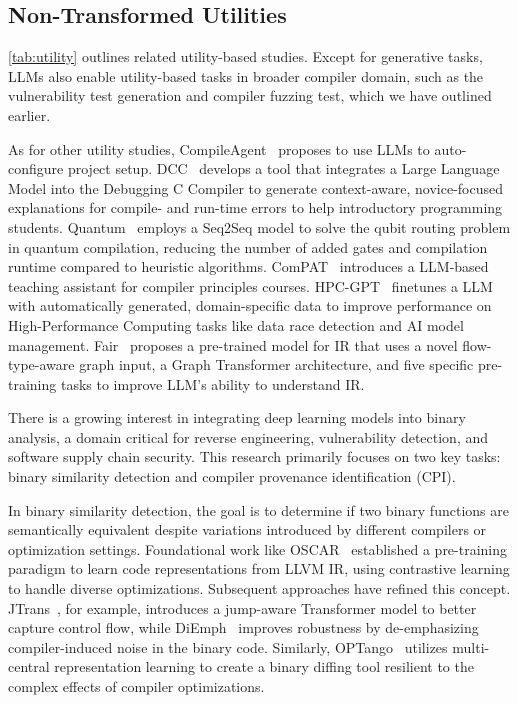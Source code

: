\documentclass[pdflatex,sn-mathphys-ay,twocolumn, a4paper]{sn-jnl}%
\theoremstyle{thmstyleone}%
\theoremstyle{thmstyletwo}%
\theoremstyle{thmstylethree}%
\begin{document}
\subsection{Non-Transformed Utilities}\label{sec:utility}

\autoref{tab:utility} outlines related utility-based studies. Except for generative tasks, LLMs also enable utility-based tasks in broader compiler domain, such as the vulnerability test generation and compiler fuzzing test, which we have outlined earlier. 


As for other utility studies, CompileAgent~\citep{8_hu2025compileagent_acl} proposes to use LLMs to auto-configure project setup. DCC~\citep{80_dcc2024} develops a tool that integrates a Large Language Model into the Debugging C Compiler to generate context-aware, novice-focused explanations for compile- and run-time errors to help introductory programming students. Quantum~\citep{89_quantum2024_dac} employs a Seq2Seq model to solve the qubit routing problem in quantum compilation, reducing the number of added gates and compilation runtime compared to heuristic algorithms. ComPAT~\citep{94_compat2024} introduces a LLM-based teaching assistant for compiler principles courses. HPC-GPT~\citep{149_hpcgpt2023_scw} finetunes a LLM with automatically generated, domain-specific data to improve performance on High-Performance Computing tasks like data race detection and AI model management. Fair~\citep{122_fair2024_icse} proposes a pre-trained model for IR that uses a novel flow-type-aware graph input, a Graph Transformer architecture, and five specific pre-training tasks to improve LLM's ability to understand IR.

There is a growing interest in integrating deep learning models into binary analysis, a domain critical for reverse engineering, vulnerability detection, and software supply chain security. This research primarily focuses on two key tasks: binary similarity detection and compiler provenance identification (CPI).

In binary similarity detection, the goal is to determine if two binary functions are semantically equivalent despite variations introduced by different compilers or optimization settings. Foundational work like OSCAR~\citep{170_how2021_icml} established a pre-training paradigm to learn code representations from LLVM IR, using contrastive learning to handle diverse optimizations. Subsequent approaches have refined this concept. JTrans~\citep{160_jtrans2022_issta}, for example, introduces a jump-aware Transformer model to better capture control flow, while DiEmph~\citep{137_2023_issta} improves robustness by de-emphasizing compiler-induced noise in the binary code. Similarly, OPTango~\citep{141_optango2023_issre} utilizes multi-central representation learning to create a binary diffing tool resilient to the complex effects of compiler optimizations.
\end{document}
